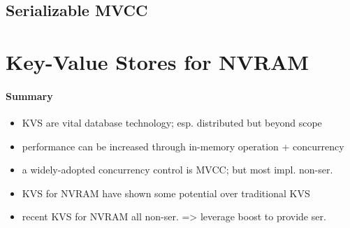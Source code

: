 \subsection{Serializable MVCC}

\section{Key-Value Stores for NVRAM}

\paragraph{Summary}

\begin{itemize}
    \item KVS are vital database technology; esp. distributed but beyond scope
    \item performance can be increased through in-memory operation + concurrency
    \item a widely-adopted concurrency control is MVCC; but most impl. non-ser.
    \item KVS for NVRAM have shown some potential over traditional KVS
    \item recent KVS for NVRAM all non-ser. => leverage boost to provide ser.
\end{itemize}
